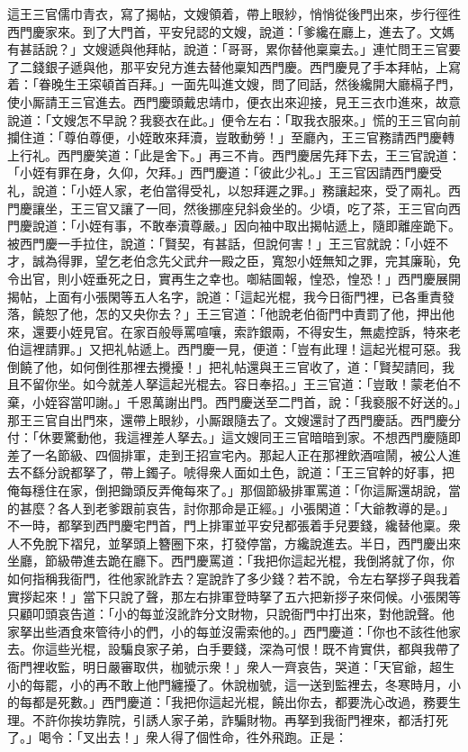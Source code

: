 這王三官儒巾青衣，寫了揭帖，文嫂領着，帶上眼紗，悄悄從後門出來，步行徑徃西門慶家來。到了大門首，平安兒認的文嫂，說道：「爹纔在廳上，進去了。文媽有甚話說？」文嫂遞與他拜帖，說道：「哥哥，累你替他稟稟去。」連忙問王三官要了二錢銀子遞與他，那平安兒方進去替他稟知西門慶。西門慶見了手本拜帖，上寫着：「眷晚生王寀頓首百拜。」一面先叫進文嫂，問了囘話，然後纔開大廳槅子門，使小厮請王三官進去。西門慶頭戴忠靖巾，便衣出來迎接，見王三衣巾進來，故意說道：「文嫂怎不早說？我褻衣在此。」便令左右：「取我衣服來。」慌的王三官向前攔住道：「尊伯尊便，小姪敢來拜瀆，豈敢動勞！」至廳內，王三官務請西門慶轉上行礼。西門慶笑道：「此是舍下。」再三不肯。西門慶居先拜下去，王三官說道：「小姪有罪在身，{}久仰，欠拜。」西門慶道：「彼此少礼。」王三官因請西門慶受礼，說道：「小姪人家，老伯當得受礼，以恕拜遲之罪。」務讓起來，受了兩礼。西門慶讓坐，王三官又讓了一囘，然後挪座兒斜僉坐的。少頃，吃了茶，王三官向西門慶說道：「小姪有事，不敢奉瀆尊嚴。」因向袖中取出揭帖遞上，隨即離座跪下。被西門慶一手拉住，說道：「賢契，{}有甚話，但說何害！」王三官就說：「小姪不才，誠為得罪，望乞老伯念先父武弁一殿之臣，寬恕小姪無知之罪，完其廉恥，免令出官，則小姪垂死之日，實再生之幸也。啣結圖報，惶恐，惶恐！」西門慶展開揭帖，上面有小張閑等五人名字，說道：「這起光棍，我今日衙門裡，已各重責發落，饒恕了他，怎的又央你去？」王三官道：「他說老伯衙門中責罰了他，押出他來，還要小姪見官。在家百般辱罵喧嚷，索詐銀兩，不得安生，無處控訴，特來老伯這裡請罪。」又把礼帖遞上。西門慶一見，便道：「豈有此理！這起光棍可惡。我倒饒了他，如何倒徃那裡去攪擾！」把礼帖還與王三官收了，道：「賢契請囘，我且不留你坐。如今就差人拏這起光棍去。容日奉招。」王三官道：「豈敢！蒙老伯不棄，小姪容當叩謝。」千恩萬謝出門。西門慶送至二門首，說：「我褻服不好送的。」那王三官自出門來，還帶上眼紗，小厮跟隨去了。文嫂還討了西門慶話。西門慶分付：「休要驚動他，我這裡差人拏去。」這文嫂同王三官暗暗到家。不想西門慶隨即差了一名節級、四個排軍，走到王招宣宅內。那起人正在那裡飲酒喧鬧，被公人進去不繇分說都拏了，帶上鐲子。唬得衆人面如土色，說道：「王三官幹的好事，把俺每穩住在家，倒把鋤頭反弄俺每來了。」{}那個節級排軍罵道：「你這厮還胡說，當的甚麼？各人到老爹跟前哀告，討你那命是正經。」小張閑道：「大爺教導的是。」不一時，都拏到西門慶宅門首，門上排軍並平安兒都張着手兒要錢，纔替他稟。衆人不免脫下褶兒，並拏頭上簪圈下來，打發停當，方纔說進去。半日，西門慶出來坐廳，節級帶進去跪在廳下。西門慶罵道：「我把你這起光棍，我倒將就了你，你如何指稱我衙門，徃他家訛詐去？寔說詐了多少錢？若不說，令左右拏拶子與我着實拶起來！」當下只說了聲，那左右排軍登時拏了五六把新拶子來伺候。小張閑等只顧叩頭哀告道：「小的每並沒訛詐分文財物，只說衙門中打出來，對他說聲。他家拏出些酒食來管待小的們，小的每並沒需索他的。」{}西門慶道：「你也不該徃他家去。你這些光棍，設騙良家子弟，白手要錢，深為可恨！既不肯實供，都與我帶了衙門裡收監，明日嚴審取供，枷號示衆！」衆人一齊哀告，哭道：「天官爺，超生小的每罷，小的再不敢上他門纏擾了。休說枷號，這一送到監裡去，冬寒時月，小的每都是死數。」西門慶道：「我把你這起光棍，饒出你去，都要洗心改過，務要生理。不許你挨坊靠院，引誘人家子弟，詐騙財物。{}再拏到我衙門裡來，都活打死了。」喝令：「叉出去！」衆人得了個性命，徃外飛跑。正是：

